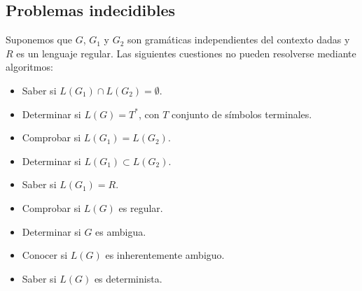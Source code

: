 \documentclass[11pt,titlepage,a4paper]{article}
\theoremstyle{ejemplo}
\theoremstyle{algoritmo}
\begin{document}
\subsection{Problemas indecidibles}

Suponemos que $G$, $G_1$ y $G_2$ son gramáticas independientes del contexto 
dadas y $R$ es un lenguaje regular. Las siguientes cuestiones no pueden
resolverse mediante algoritmos:
\begin{itemize}[noitemsep]
	\item Saber si $L(G_1)\cap L(G_2)=\emptyset$.
	\item Determinar si $L(G)=T^*$, con $T$ conjunto de símbolos terminales.
	\item Comprobar si $L(G_1)=L(G_2)$.
	\item Determinar si $L(G_1)\subset L(G_2)$.
	\item Saber si $L(G_1)=R$.
	\item Comprobar si $L(G)$ es regular.
	\item Determinar si $G$ es ambigua.
	\item Conocer si $L(G)$ es inherentemente ambiguo.
	\item Saber si $L(G)$ es determinista.
\end{itemize}
\end{document}
